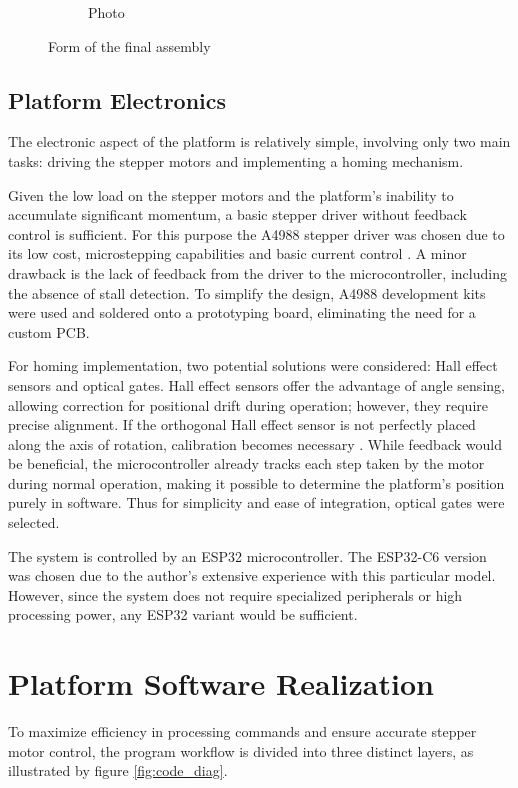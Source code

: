 \begin{figure}[h!]
\begin{subfigure}[b]{0.45\textwidth}
    \caption{Photo}
  \end{subfigure}
  \caption{Form of the final assembly}
  \label{fig:side_by_side}
\end{figure}


\subsection{Platform Electronics}

The electronic aspect of the platform is relatively simple, involving only two main tasks: driving the stepper motors and implementing a homing mechanism.

Given the low load on the stepper motors and the platform's inability to accumulate significant momentum, a basic stepper driver without feedback control is sufficient.
For this purpose the A4988 stepper driver was chosen due to its low cost, microstepping capabilities and basic current control \cite{a4988}.
A minor drawback is the lack of feedback from the driver to the microcontroller, including the absence of stall detection.
To simplify the design, A4988 development kits were used and soldered onto a prototyping board, eliminating the need for a custom PCB.

For homing implementation, two potential solutions were considered: Hall effect sensors and optical gates.
Hall effect sensors offer the advantage of angle sensing, allowing correction for positional drift during operation; however, they require precise alignment.
If the orthogonal Hall effect sensor is not perfectly placed along the axis of rotation, calibration becomes necessary \cite{hall}.
While feedback would be beneficial, the microcontroller already tracks each step taken by the motor during normal operation, making it possible to determine the platform's position purely in software.
Thus for simplicity and ease of integration, optical gates were selected.

The system is controlled by an ESP32 microcontroller.
The ESP32-C6 version was chosen due to the author's extensive experience with this particular model.
However, since the system does not require specialized peripherals or high processing power, any ESP32 variant would be sufficient.

\section{Platform Software Realization}

To maximize efficiency in processing commands and ensure accurate stepper motor control, the program workflow is divided into three distinct layers, as illustrated by figure \ref{fig:code_diag}.


